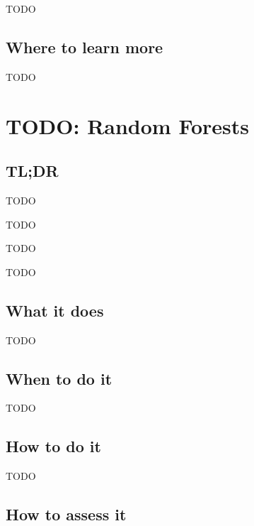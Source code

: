 \documentclass[
]{book}
\providecommand{\tightlist}{%
  \setlength{\itemsep}{0pt}\setlength{\parskip}{0pt}}
\begin{document}
TODO

\hypertarget{where-to-learn-more-15}{%
\section{Where to learn more}\label{where-to-learn-more-15}}

TODO

\hypertarget{random-forests}{%
\chapter{TODO: Random Forests}\label{random-forests}}

\hypertarget{tldr-16}{%
\section{TL;DR}\label{tldr-16}}

\begin{description}
\tightlist
\item[What it does]
TODO
\item[When to do it]
TODO
\item[How to do it]
TODO
\item[How to assess it]
TODO
\end{description}

\hypertarget{what-it-does-16}{%
\section{What it does}\label{what-it-does-16}}

TODO

\hypertarget{when-to-do-it-16}{%
\section{When to do it}\label{when-to-do-it-16}}

TODO

\hypertarget{how-to-do-it-16}{%
\section{How to do it}\label{how-to-do-it-16}}

TODO

\hypertarget{how-to-assess-it-16}{%
\section{How to assess it}\label{how-to-assess-it-16}}
\end{document}
